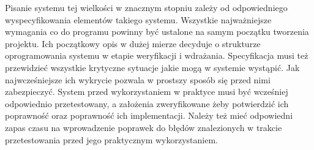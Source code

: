 \documentclass[eng]{mgr}
\begin{document}
	Pisanie systemu tej wielkości w znacznym stopniu zależy od odpowiedniego wyspecyfikowania elementów takiego systemu. Wszystkie najważniejsze wymagania co do programu powinny być ustalone na samym początku tworzenia projektu. Ich początkowy opis w dużej mierze decyduje o strukturze oprogramowania systemu w etapie weryfikacji i wdrażania.  Specyfikacja musi też przewidzieć wszystkie krytyczne sytuacje jakie mogą w systemie wystąpić. Jak najwcześniejsze ich wykrycie pozwala w prostszy sposób się przed nimi zabezpieczyć. System przed wykorzystaniem w praktyce musi być wcześniej odpowiednio przetestowany, a założenia zweryfikowane żeby potwierdzić ich poprawność oraz poprawność ich implementacji. Należy też mieć odpowiedni zapas czasu na wprowadzenie poprawek do błędów znalezionych w trakcie przetestowania przed jego praktycznym wykorzystaniem.
			
	
	
			
\end{document}
